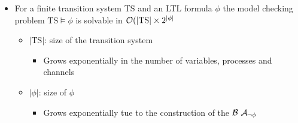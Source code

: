 \begin{itemize}
\begin{itemize}
\begin{itemize}
\begin{itemize}
                            \item For a finite transition system TS and an LTL formula $\phi$ the model checking problem $\text{TS} \models \phi$ is solvable in $\mathcal{O}(| \text{TS} | \times 2^{|\phi|}$
                                \begin{itemize}
                                    \item $|\text{TS}|$: size of the transition system
                                        \begin{itemize}
                                            \item Grows exponentially in the number of variables, processes and channels
                                        \end{itemize}
                                    \item $| \phi |$: size of $\phi$
                                        \begin{itemize}
                                            \item Grows exponentially tue to the construction of the $\mathcal{B} \ \mathcal{A}_{\neg \phi}$
                                        \end{itemize}
                                \end{itemize}
                        \end{itemize}
                \end{itemize}
        \end{itemize}
\end{itemize}
